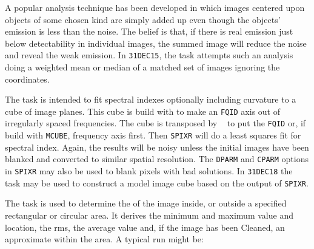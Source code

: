 A popular analysis technique has been developed in which images
centered upon objects of some chosen kind are simply added up even
though the objects' emission is less than the noise.  The belief is
that, if there is real emission just below detectability in individual
images, the summed image will reduce the noise and reveal the weak
emission.  In {\tt 31DEC15}, the task {\tt {}} attempts such
an analysis doing a weighted mean or median of a matched set of images
ignoring the coordinates.

The task {\tt {}} is intended to fit spectral indexes
optionally including curvature to a cube of image planes.  This cube
is build with {\tt {}} to make an {\tt FQID} axis out of
irregularly spaced frequencies.  The cube is transposed by {\tt
{}} to put the {\tt FQID} or, if build with {\tt MCUBE},
frequency axis first.  Then {\tt SPIXR} will do a least squares fit
for spectral index.  Again, the results will be noisy unless the
initial images have been blanked and converted to similar spatial
resolution.  The {\tt DPARM} and {\tt CPARM} options in {\tt SPIXR}
may also be used to blank pixels with bad solutions.  In {\tt 31DEC18}
the task {\tt {}} may be used to construct a model image
cube based on the output of {\tt SPIXR}\@.


     The task {\tt {}} is used to determine the
 of the image inside, or outside a specified
rectangular or circular area.  It derives the minimum and maximum
value and location, the rms, the average value and, if the image has
been Cleaned, an approximate  within the area.  A
typical run might be:

